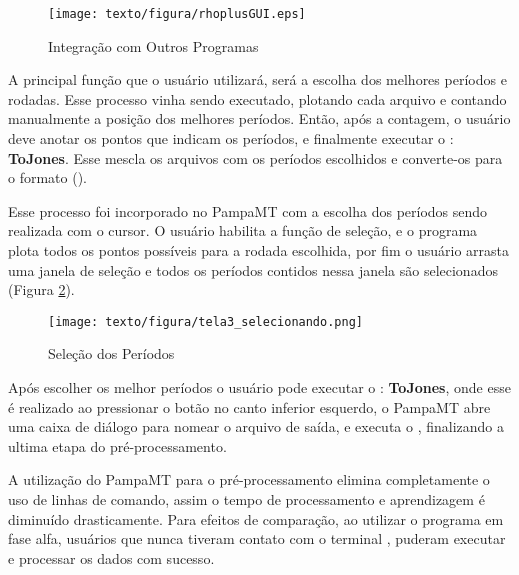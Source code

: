     \begin{figure}[H]
        \caption{Integração com Outros Programas}
            \begin{center}
                \texttt{[image: texto/figura/rhoplusGUI.eps]}
            \end{center}
        \label{rhoplusGUI}
    \end{figure}
    
    A principal função que o usuário utilizará, será a escolha dos melhores períodos e rodadas. Esse processo vinha sendo executado, plotando cada arquivo  e contando manualmente a posição dos melhores períodos. Então, após a contagem, o usuário deve anotar os pontos que indicam os períodos, e finalmente executar o : \textbf{ToJones}. Esse  mescla os arquivos  com os períodos escolhidos e converte-os para o formato  ().
    
    Esse processo foi incorporado no PampaMT com a escolha dos períodos sendo realizada com o cursor. O usuário habilita a função de seleção, e o programa plota todos os pontos possíveis para a rodada escolhida, por fim o usuário arrasta uma janela de seleção e todos os períodos contidos nessa janela são selecionados (Figura \ref{selc-perio}).
    
    \begin{landscape}
    \begin{figure}[h]
        \caption{Seleção dos Períodos}
            \begin{center}
                \texttt{[image: texto/figura/tela3\_selecionando.png]}
            \end{center}
        \label{selc-perio}
    \end{figure}
    \end{landscape}
    
    Após escolher os melhor períodos o usuário pode executar o : \textbf{ToJones}, onde esse é realizado ao pressionar o botão no canto inferior esquerdo, o PampaMT abre uma caixa de diálogo para nomear o arquivo de saída, e executa o , finalizando a ultima etapa do pré-processamento.
    
    A utilização do PampaMT para o pré-processamento elimina completamente o uso de linhas de comando, assim o tempo de processamento e aprendizagem é diminuído drasticamente. Para efeitos de comparação, ao utilizar o programa em fase alfa, usuários que nunca tiveram contato com o terminal \Shell, puderam executar e processar os dados com sucesso.
    
